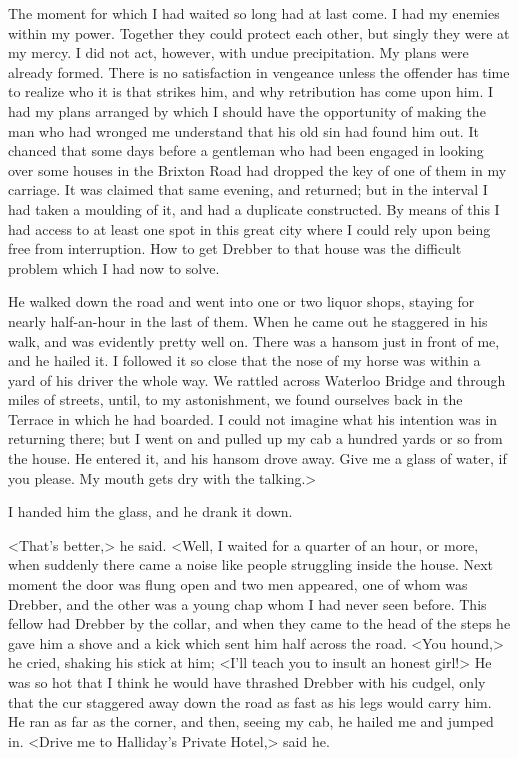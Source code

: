 The moment for which I had waited so long had at last come. I had my enemies within my power. Together they could protect each other, but singly they were at my mercy. I did not act, however, with undue precipitation. My plans were already formed. There is no satisfaction in vengeance unless the offender has time to realize who it is that strikes him, and why retribution has come upon him. I had my plans arranged by which I should have the opportunity of making the man who had wronged me understand that his old sin had found him out. It chanced that some days before a gentleman who had been engaged in looking over some houses in the Brixton Road had dropped the key of one of them in my carriage. It was claimed that same evening, and returned; but in the interval I had taken a moulding of it, and had a duplicate constructed. By means of this I had access to at least one spot in this great city where I could rely upon being free from interruption. How to get Drebber to that house was the difficult problem which I had now to solve.

He walked down the road and went into one or two liquor shops, staying for nearly half-an-hour in the last of them. When he came out he staggered in his walk, and was evidently pretty well on. There was a hansom just in front of me, and he hailed it. I followed it so close that the nose of my horse was within a yard of his driver the whole way. We rattled across Waterloo Bridge and through miles of streets, until, to my astonishment, we found ourselves back in the Terrace in which he had boarded. I could not imagine what his intention was in returning there; but I went on and pulled up my cab a hundred yards or so from the house. He entered it, and his hansom drove away. Give me a glass of water, if you please. My mouth gets dry with the talking.>

I handed him the glass, and he drank it down.

<That's better,> he said. <Well, I waited for a quarter of an hour, or more, when suddenly there came a noise like people struggling inside the house. Next moment the door was flung open and two men appeared, one of whom was Drebber, and the other was a young chap whom I had never seen before. This fellow had Drebber by the collar, and when they came to the head of the steps he gave him a shove and a kick which sent him half across the road. <You hound,> he cried, shaking his stick at him; <I'll teach you to insult an honest girl!> He was so hot that I think he would have thrashed Drebber with his cudgel, only that the cur staggered away down the road as fast as his legs would carry him. He ran as far as the corner, and then, seeing my cab, he hailed me and jumped in. <Drive me to Halliday's Private Hotel,> said he.

